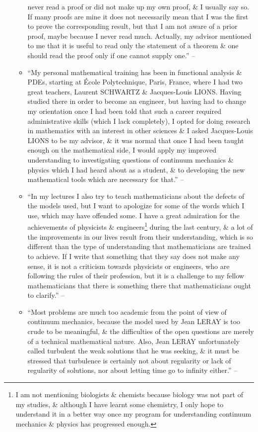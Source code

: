 \documentclass{article}
\begin{document}
\begin{enumerate}
\begin{itemize}
never read a proof or did not make up my own proof, \& I usually say so. If many proofs are mine it does not necessarily mean that I was the first to prove the corresponding result, but that I am not aware of a prior proof, maybe because I never read much. Actually, my advisor mentioned to me that it is useful to read only the statement of a theorem \& one should read the proof only if one cannot supply one.'' -- \cite[Preface, pp. xii--xiii]{Tartar2006}
		\item ``My personal mathematical training has been in functional analysis \& PDEs, starting at \'Ecole Polytechnique, Paris, France, where I had two great teachers, Laurent SCHWARTZ \& Jacques-Louis LIONS. Having studied there in order to become an engineer, but having had to change my orientation once I had been told that such a career required administrative skills (which I lack completely), I opted for doing research in mathematics with an interest in other sciences \& I asked Jacques-Louis LIONS to be my advisor, \& it was normal that once I had been taught enough on the mathematical side, I would apply my improved understanding to investigating questions of continuum mechanics \& physics which I had heard about as a student, \& to developing the new mathematical tools which are necessary for that.'' -- \cite[Preface, p. xiii]{Tartar2006}
		\item ``In my lectures I also try to teach mathematicians about the defects of the models used, but I want to apologize for some of the words which I use, which may have offended some. I have a great admiration for the achievements of physicists \& engineers\footnote{I am not mentioning biologists \& chemists because biology was not part of my studies, \& although I have learnt some chemistry, I only hope to understand it in a better way once my program for understanding continuum mechanics \& physics has progressed enough.} during the last century, \& a lot of the improvements in our lives result from their understanding, which is so different than the type of understanding that mathematicians are trained to achieve. If I write that something that they say does not make any sense, it is not a criticism towards physicists or engineers, who are following the rules of their profession, but it is a challenge to my fellow mathematicians that there is something there that mathematicians ought to clarify.'' -- \cite[Preface, p. xiii]{Tartar2006}
		\item ``Most problems are much too academic from the point of view of continuum mechanics, because the model used by Jean LERAY is too crude to be meaningful, \& the difficulties of the open questions are merely of a technical mathematical nature. Also, Jean LERAY unfortunately called turbulent the weak solutions that he was seeking, \& it must be stressed that turbulence is certainly not about regularity or lack of regularity of solutions, nor about letting time go to infinity either.'' -- \cite[Introduction, p. xv]{Tartar2006}

\end{itemize}
\end{enumerate}
\end{document}

